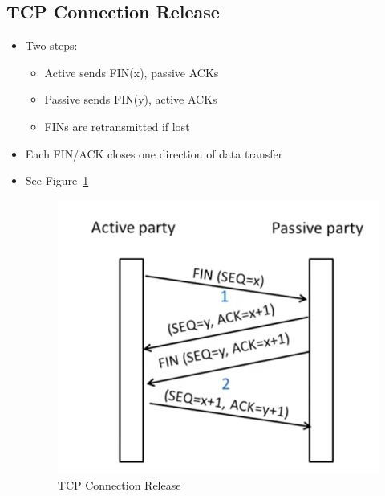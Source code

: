 \documentclass[12pt]{ctexart}   %
\begin{document}
	\subsection{TCP Connection Release}
	\begin{itemize}
		\item Two steps:
		\begin{itemize}
			\item Active sends FIN(x), passive ACKs
			\item Passive sends FIN(y), active ACKs
			\item FINs are retransmitted if lost
		\end{itemize}
		
		\item Each FIN/ACK closes one direction of data transfer
		 \item See Figure~\ref{fig:6-4-2}
		  
		 \begin{figure}[h!] %
		\centering
		 \includegraphics[scale=0.7]{images/6-4-2}
		\caption{  TCP Connection Release }
		 \label{fig:6-4-2}
		 \end{figure}
	\end{itemize}
	
\end{document}
